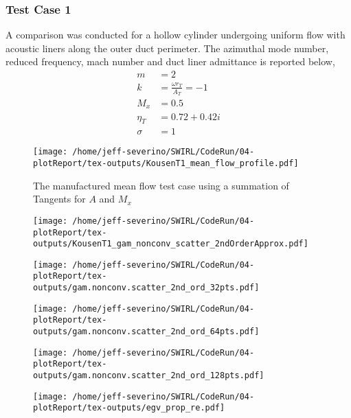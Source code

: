 \subsubsection{Test Case 1}
A comparison was conducted for a hollow cylinder undergoing uniform flow with
acoustic liners along the outer duct perimeter. The azimuthal mode number, reduced 
frequency, mach number and duct liner admittance is reported below,
\begin{align*}
    m &= 2 \\
    k &= \frac{\omega r_T}{A_T} = -1 \\
    M_x &= 0.5 \\
    \eta_T &= 0.72 + 0.42i\\
    \sigma &= 1
\end{align*} 

\begin{figure}[h!]
    \centering
    \texttt{[image: /home/jeff-severino/SWIRL/CodeRun/04-plotReport/tex-outputs/KousenT1\_mean\_flow\_profile.pdf]}
    \caption{The manufactured mean flow test case using a summation of Tangents for $A$ and $M_x$}
    \label{fig:1}
\end{figure}


\begin{figure}[h!]
    \centering
    \texttt{[image: /home/jeff-severino/SWIRL/CodeRun/04-plotReport/tex-outputs/KousenT1\_gam\_nonconv\_scatter\_2ndOrderApprox.pdf]}
\end{figure}



\begin{figure}[h!]
    \centering
    \texttt{[image: /home/jeff-severino/SWIRL/CodeRun/04-plotReport/tex-outputs/gam.nonconv.scatter\_2nd\_ord\_32pts.pdf]}
\end{figure}

\begin{figure}[h!]
    \centering
    \texttt{[image: /home/jeff-severino/SWIRL/CodeRun/04-plotReport/tex-outputs/gam.nonconv.scatter\_2nd\_ord\_64pts.pdf]}
\end{figure}


\begin{figure}[h!]
    \centering
    \texttt{[image: /home/jeff-severino/SWIRL/CodeRun/04-plotReport/tex-outputs/gam.nonconv.scatter\_2nd\_ord\_128pts.pdf]}
\end{figure}

\begin{figure}[h!]
    \centering
    \texttt{[image: /home/jeff-severino/SWIRL/CodeRun/04-plotReport/tex-outputs/egv\_prop\_re.pdf]}
    \label{fig:prop_re}
\end{figure}

